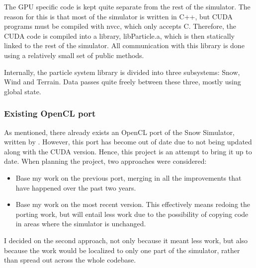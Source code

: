 The GPU specific code is kept quite separate from the rest of the simulator. The reason for this is that most of the simulator is written in C++, but CUDA programs must be compiled with nvcc, which only accepts C. Therefore, the CUDA code is compiled into a library, libParticle.a, which is then statically linked to the rest of the simulator. All communication with this library is done using a relatively small set of public methods.

Internally, the particle system library is divided into three subsystems: Snow, Wind and Terrain. Data passes quite freely between these three, mostly using global state. 

\subsubsection*{Existing OpenCL port}
As mentioned, there already exists an OpenCL port of the Snow Simulator, written by \citet{vestre2012enhancing}. However, this port has become out of date due to not being updated along with the CUDA version. Hence, this project is an attempt to bring it up to date. When planning the project, two approaches were considered: 
\begin{itemize}
\item Base my work on the previous port, merging in all the improvements that have happened over the past two years.
\item Base my work on the most recent version. This effectively means redoing the porting work, but will entail less work due to the possibility of copying code in areas where the simulator is unchanged.
\end{itemize}
I decided on the second approach, not only because it meant less work, but also because the work would be localized to only one part of the simulator, rather than spread out across the whole codebase.